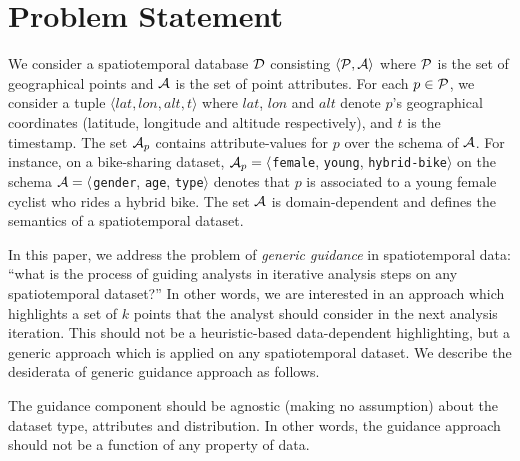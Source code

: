 \section{Problem Statement}
\label{sec:pb}

 We consider a spatiotemporal database ${\cal D}$ consisting $\langle {\cal P}, {\cal A} \rangle$ where ${\cal P}$ is the set of
geographical points and ${\cal A}$ is the set of point attributes. For each $p \in {\cal P}$, we consider a tuple $\langle lat, lon, alt, t\rangle$ where $lat$, $lon$ and $alt$ denote $p$'s geographical coordinates (latitude, longitude and altitude respectively), and $t$ is the timestamp. The set ${\cal A}_p$ contains attribute-values for $p$ over the schema of ${\cal A}$. For instance, on a bike-sharing dataset, ${\cal A}_p = \langle${\tt female}, {\tt young}, {\tt hybrid-bike}$\rangle$ on the schema ${\cal A} = \langle${\tt gender}, {\tt age}, {\tt type}$\rangle$ denotes that $p$ is associated to a young female cyclist who rides a hybrid bike. The set ${\cal A}$ is domain-dependent and defines the semantics of a spatiotemporal dataset.

\vspace{5pt}
In this paper, we address the problem of {\em generic guidance} in spatiotemporal data: ``what is the process of guiding analysts in iterative analysis steps on any spatiotemporal dataset?'' In other words, we are interested in an approach which highlights a set of $k$ points that the analyst should consider in the next analysis iteration. This should not be a heuristic-based data-dependent highlighting, but a generic approach which is applied on any spatiotemporal dataset. We describe the desiderata of generic guidance approach as follows.

\vspace{5pt}
 The guidance component should be agnostic (making no assumption) about the dataset type, attributes and distribution. In other words, the guidance approach should not be a function of any property of data.


